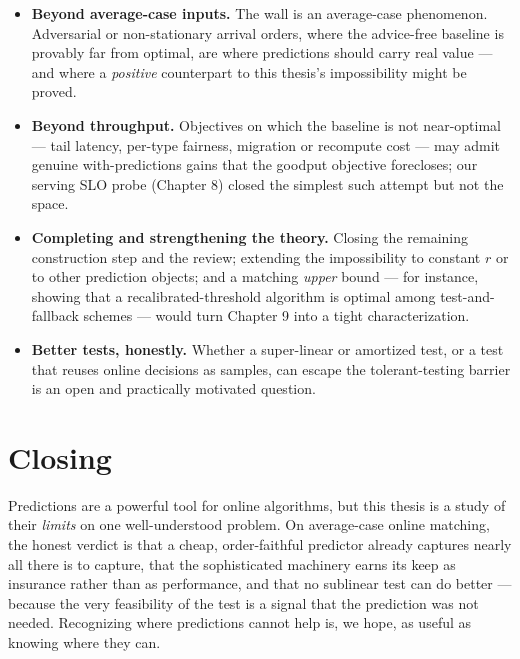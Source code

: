 \begin{itemize}
\tightlist
\item
  \textbf{Beyond average-case inputs.} The wall is an average-case phenomenon. Adversarial or
  non-stationary arrival orders, where the advice-free baseline is provably far from optimal,
  are where predictions should carry real value --- and where a \emph{positive} counterpart to this
  thesis's impossibility might be proved.
\item
  \textbf{Beyond throughput.} Objectives on which the baseline is not near-optimal --- tail latency,
  per-type fairness, migration or recompute cost --- may admit genuine with-predictions gains
  that the goodput objective forecloses; our serving SLO probe (Chapter 8) closed the
  simplest such attempt but not the space.
\item
  \textbf{Completing and strengthening the theory.} Closing the remaining construction step and
  the review; extending the impossibility to constant \(r\) or to other prediction objects; and
  a matching \emph{upper} bound --- for instance, showing that a recalibrated-threshold algorithm is
  optimal among test-and-fallback schemes --- would turn Chapter 9 into a tight characterization.
\item
  \textbf{Better tests, honestly.} Whether a super-linear or amortized test, or a test that reuses
  online decisions as samples, can escape the tolerant-testing barrier is an open and
  practically motivated question.
\end{itemize}

\section{Closing}\label{closing}

Predictions are a powerful tool for online algorithms, but this thesis is a study of their
\emph{limits} on one well-understood problem. On average-case online matching, the honest verdict
is that a cheap, order-faithful predictor already captures nearly all there is to capture,
that the sophisticated machinery earns its keep as insurance rather than as performance, and
that no sublinear test can do better --- because the very feasibility of the test is a signal
that the prediction was not needed. Recognizing where predictions cannot help is, we hope, as
useful as knowing where they can.
